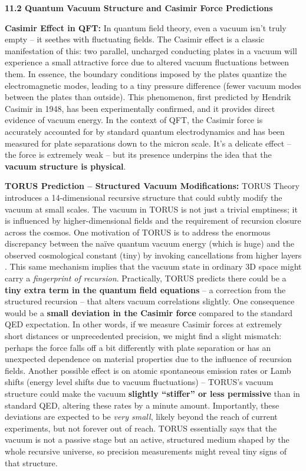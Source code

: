 \documentclass[]{article}
\begin{document}
\textbf{11.2 Quantum Vacuum Structure and Casimir Force Predictions}

\textbf{Casimir Effect in QFT:} In quantum field theory, even a vacuum
isn't truly empty -- it seethes with fluctuating fields. The Casimir
effect is a classic manifestation of this: two parallel, uncharged
conducting plates in a vacuum will experience a small attractive force
due to altered vacuum fluctuations between them​. In essence, the
boundary conditions imposed by the plates quantize the electromagnetic
modes, leading to a tiny pressure difference (fewer vacuum modes between
the plates than outside)​. This phenomenon, first predicted by Hendrik
Casimir in 1948, has been experimentally confirmed, and it provides
direct evidence of vacuum energy. In the context of QFT, the Casimir
force is accurately accounted for by standard quantum electrodynamics
and has been measured for plate separations down to the micron scale.
It's a delicate effect -- the force is extremely weak -- but its
presence underpins the idea that the \textbf{vacuum structure is
physical}.

\textbf{TORUS Prediction -- Structured Vacuum Modifications:} TORUS
Theory introduces a 14-dimensional recursive structure that could subtly
modify the vacuum at small scales. The vacuum in TORUS is not just a
trivial emptiness; it is influenced by higher-dimensional fields and the
requirement of recursion closure across the cosmos. One motivation of
TORUS is to address the enormous discrepancy between the naïve quantum
vacuum energy (which is huge) and the observed cosmological constant
(tiny) by invoking cancellations from higher layers​. This same
mechanism implies that the vacuum state in ordinary 3D space might carry
a \emph{fingerprint of recursion}. Practically, TORUS predicts there
could be a \textbf{tiny extra term in the quantum field equations} -- a
correction from the structured recursion -- that alters vacuum
correlations slightly​. One consequence would be a \textbf{small
deviation in the Casimir force} compared to the standard QED
expectation​. In other words, if we measure Casimir forces at extremely
short distances or unprecedented precision, we might find a slight
mismatch: perhaps the force falls off a bit differently with plate
separation or has an unexpected dependence on material properties due to
the influence of recursion fields. Another possible effect is on atomic
spontaneous emission rates or Lamb shifts (energy level shifts due to
vacuum fluctuations) -- TORUS's vacuum structure could make the vacuum
\textbf{slightly ``stiffer'' or less permissive} than in standard QED,
altering these rates by a minute amount​. Importantly, these deviations
are expected to be \emph{very small}, likely beyond the reach of current
experiments, but not forever out of reach​. TORUS essentially says that
the vacuum is not a passive stage but an active, structured medium
shaped by the whole recursive universe, so precision measurements might
reveal tiny signs of that structure.
\end{document}
